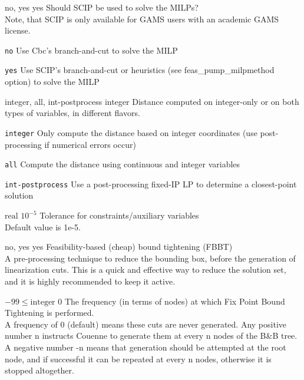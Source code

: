 %
{\ttfamily no, yes}%
{yes}%
{Should SCIP be used to solve the MILPs?\\
Note, that SCIP is only available for GAMS users with an academic GAMS license.}%
{\begin{list}{}{
\setlength{\parsep}{0em}
\setlength{\leftmargin}{5ex}
\setlength{\labelwidth}{2ex}
\setlength{\itemindent}{0ex}
\setlength{\topsep}{0pt}}
\item[\texttt{no}] Use Cbc's branch-and-cut to solve the MILP
\item[\texttt{yes}] Use SCIP's branch-and-cut or heuristics (see feas\_pump\_milpmethod option) to solve the MILP
\end{list}
}

%
{\ttfamily integer, all, int-postprocess}%
{integer}%
{Distance computed on integer-only or on both types of variables, in different flavors.}%
{\begin{list}{}{
\setlength{\parsep}{0em}
\setlength{\leftmargin}{5ex}
\setlength{\labelwidth}{2ex}
\setlength{\itemindent}{0ex}
\setlength{\topsep}{0pt}}
\item[\texttt{integer}] Only compute the distance based on integer coordinates (use post-processing if numerical errors occur)
\item[\texttt{all}] Compute the distance using continuous and integer variables
\item[\texttt{int-postprocess}] Use a post-processing fixed-IP LP to determine a closest-point solution
\end{list}
}

%
{$\textrm{real}$}%
{$10^{- 5}$}%
{Tolerance for constraints/auxiliary variables\\
Default value is 1e-5.}%
{}

%
{\ttfamily no, yes}%
{yes}%
{Feasibility-based (cheap) bound tightening (FBBT)\\
A pre-processing technique to reduce the bounding box, before the generation of linearization cuts. This is a quick and effective way to reduce the solution set, and it is highly recommended to keep it active.}%
{}

%
{$-99\leq\textrm{integer}$}%
{$0$}%
{The frequency (in terms of nodes) at which Fix Point Bound Tightening is performed.\\
A frequency of 0 (default) means these cuts are never generated. Any positive number n instructs Couenne to generate them at every n nodes of the B\&B tree. A negative number -n means that generation should be attempted at the root node, and if successful it can be repeated at every n nodes, otherwise it is stopped altogether.}%
{}

